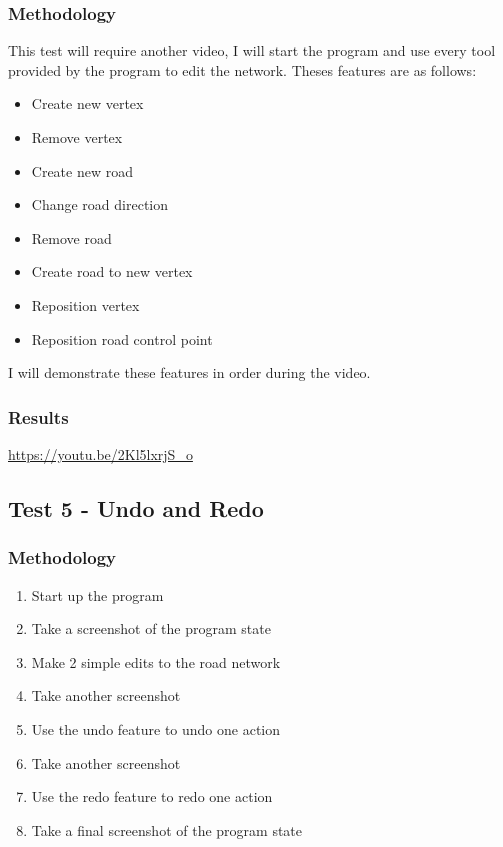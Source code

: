         \subsubsection{Methodology}

            This test will require another video, I will start the program and use every tool provided by the program to edit the network. Theses features are as follows:

            \begin{itemize}
                \item Create new vertex
                \item Remove vertex
                \item Create new road
                \item Change road direction
                \item Remove road
                \item Create road to new vertex
                \item Reposition vertex
                \item Reposition road control point
            \end{itemize}

            I will demonstrate these features in order during the video.

        \subsubsection{Results}

            \href{https://youtu.be/2Kl5lxrjS\_o}{https://youtu.be/2Kl5lxrjS\_o}

    \subsection{Test 5 - Undo and Redo}

        \subsubsection{Methodology}

            \begin{enumerate}
                \item Start up the program
                \item Take a screenshot of the program state
                \item Make 2 simple edits to the road network
                \item Take another screenshot
                \item Use the undo feature to undo one action
                \item Take another screenshot
                \item Use the redo feature to redo one action
                \item Take a final screenshot of the program state
            \end{enumerate}

